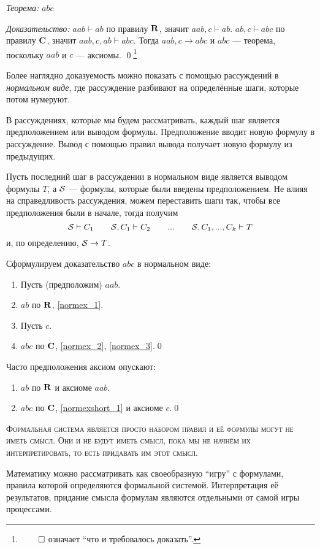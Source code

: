 {\it Теорема:} $abc$

{\it Доказательство:}
$aab\vdash ab$ по правилу $\mathbf{R}$, значит $aab,c\vdash ab$.
$ab,c\vdash abc$ по правилу $\mathbf{C}$, значит $aab,c,ab\vdash abc$.
Тогда $aab,c\to abc$ и $abc$ --- теорема, поскольку $aab$ и $c$ --- аксиомы.
\qed\footnote{$\qed$ означает ``что и требовалось доказать''.}

Более наглядно
доказуемость можно показать с помощью рассуждений в
{\it нормальном виде}, где рассуждение
разбивают на определённые шаги, которые потом нумеруют.

В рассуждениях, которые мы будем рассматривать, каждый шаг является предположением
или выводом формулы. Предположение вводит новую формулу в рассуждение.
Вывод с помощью правил вывода получает новую формулу из предыдущих.

Пусть последний шаг в рассуждении в нормальном виде является выводом формулы $T$,
а $\mathcal S$ --- формулы, которые были введены предположением.
Не влияя на справедливость рассуждения,
можем переставить шаги так, чтобы все предположения были в начале,
тогда получим
\[
  \mathcal S\vdash C_1\qquad \mathcal S,C_1\vdash C_2\qquad ...
  \qquad \mathcal S,C_1,...,C_{k}\vdash T
\]
и, по определению, $\mathcal S\to T$.

Сформулируем доказательство $abc$ в нормальном виде:
\begin{enumerate}[label=(\arabic*)]
  \item{}\label{normex_1}Пусть (предположим) $aab$.
  \item{}\label{normex_3}$ab$ по $\mathbf{R}$, \ref{normex_1}.
  \item{}\label{normex_2}Пусть $c$.
  \item{}\label{normex_4}$abc$ по $\mathbf{C}$, \ref{normex_2}, \ref{normex_3}.\qed
\end{enumerate}
Часто предположения аксиом опускают:
\begin{enumerate}[label=(\arabic*)]
  \item{}\label{normexshort_1}$ab$ по $\mathbf{R}$ и аксиоме $aab$.
  \item{}\label{normexshort_2}$abc$ по $\mathbf{C}$,
  \ref{normexshort_1} и аксиоме $c$.\qed
\end{enumerate}

\textsc{Формальная система является просто набором правил и её формулы
  могут не иметь смысл. Они и не будут иметь смысл, пока мы не начнём их
  интерпретировать, то есть придавать им этот смысл.}

Математику можно рассматривать как своеобразную ``игру'' с формулами,
правила которой определяются формальной системой.
Интерпретация её результатов, придание смысла формулам являются
отдельными от самой игры процессами.

